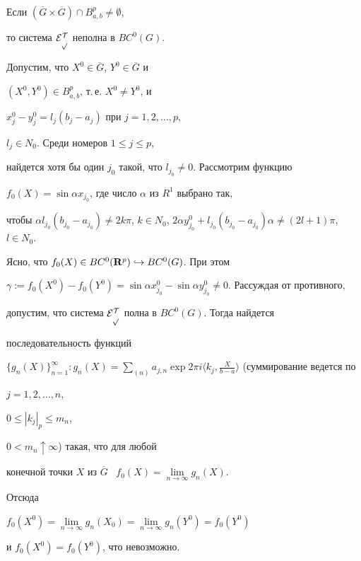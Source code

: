 \begin{thm}


Если $(\overline G\times\overline G)\cap B^p_{a,b}\neq \emptyset$,


то система $\cal{E}_p^T$  неполна в $BC^0(G)$.


\end{thm}








\begin{pf}


Допустим, что $X^0{\in}\overline G$, $Y^0{\in}\overline G$ и


$(X^0,Y^0){\in} B^p_{a,b}$, т.\,е. $X^0\neq Y^0$, и 


$x_j^0-y_j^0=l_j(b_j-a_j)$ при $j=1,2,\dotsc, p$,


$l_j\in N_0$. Среди номеров $1\leqslant j\leqslant p$,


найдется хотя бы один $j_0$ такой, что $l_{j_0}\neq 0$. Рассмотрим функцию


$f_0(X)=\sin\alpha x_{j_0}$, где число $\alpha$ из $R^1$ выбрано так,


чтобы $\alpha l_{j_0}(b_{j_0}-a_{j_0})\neq 2k\pi$, $k\in N_0$, $2\alpha


y^0_{j_0}+l_{j_0}(b_{j_0}-a_{j_0})\alpha \neq (2l+1)\pi$, $l\in N_0$.


Ясно, что $f_0(X)\in BC^0({\bold R}^p)\hookrightarrow BC^0(G)$. При этом


$\gamma:=f_0(X^0)-f_0(Y^0)=


\sin\alpha x^0_{j_0}-\sin\alpha y_{j_0}^0\neq 0$. Рассуждая от противного,


допустим, что система $\cal{E}^T_p$ полна в $BC^0(G)$. Тогда найдется


последовательность функций


$\{g_n(X)\}^{\infty}_{n=1}:g_n(X)=\sum\limits_{(n)}a_{j,n}\exp


2\pi i \langle k_j,\frac{X}{b-a}\rangle$ (суммирование ведется по


$j=1,2,\dotsc,n$,


$0\leqslant |k_j|_p\leqslant m_n$,


$0<m_n\uparrow\infty$) такая, что для любой


конечной точки $X$ из $\overline{G}$ \ $f_0(X)=\lim\limits_{n\to


\infty}g_n(X)$.


Отсюда


$f_0(X^0)=\lim\limits_{n\to\infty}g_n(X_0)=


\lim\limits_{n\to\infty}g_n(Y^0)=f_0(Y^0)$


и $f_0(X^0)=f_0(Y^0)$, что невозможно.


\end{pf}






